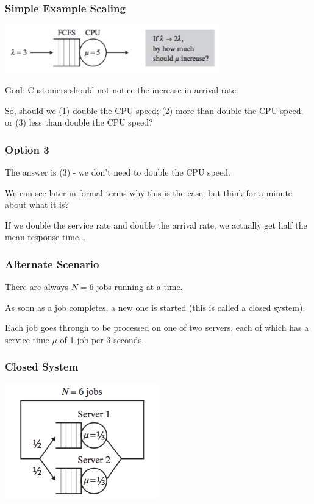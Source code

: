 \begin{frame}
\frametitle{Simple Example Scaling}

\begin{center}
	\includegraphics[width=0.7\textwidth]{images/qt-example1.png}
\end{center}

Goal: Customers should not notice the increase in arrival rate. 

So, should we (1) double the CPU speed; (2) more than double the CPU speed; or (3) less than double the CPU speed?

\end{frame}



\begin{frame}
\frametitle{Option 3}


The answer is (3) - we don't need to double the CPU speed. 

We can see later in formal terms why this is the case, but think for a minute about what it is? 

If we double the service rate and double the arrival rate, we actually get half the mean response time...


\end{frame}



\begin{frame}
\frametitle{Alternate Scenario}

There are always $N=6$ jobs running at a time. 

As soon as a job completes, a new one is started (this is called a \alert{closed system}). 

Each job goes through to be processed on one of two servers, each of which has a service time $\mu$ of 1 job per 3 seconds.

\end{frame}



\begin{frame}
\frametitle{Closed System}

\begin{center}
	\includegraphics[width=0.5\textwidth]{images/qt-example2.png}
\end{center}

\end{frame}



